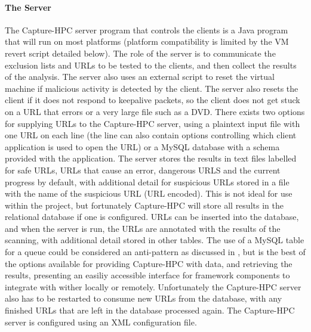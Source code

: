 \paragraph{The Server}
The Capture-HPC server program that controls the clients is a Java program that
will run on most platforms (platform compatibility is limited by the VM revert
script detailed below). The role of the server is to communicate the exclusion
lists and URLs to be tested to the clients, and then collect the results of the
analysis. The server also uses an external script to reset the virtual machine
if malicious activity is detected by the client. The server also resets the
client if it does not respond to keepalive packets, so the client does not get
stuck on a URL that errors or a very large file such as a DVD. There exists two
options for supplying URLs to the
Capture-HPC server, using a plaintext input file with one URL on each line (the
line can also contain options controlling which client application is used to
open the URL) or a MySQL database with a schema provided with the application.
The server stores the results in text files labelled for safe URLs, URLs that
cause an error, dangerous URLS and the current
progress by default, with additional detail for suspicious URLs stored in a file
with the name of the suspicious URL (URL encoded). This is not ideal for use within
the project, but fortunately Capture-HPC will store all results in the
relational database if one is configured. URLs can be inserted into the
database, and when the server is run, the URLs are annotated with the results of
the scanning, with additional detail stored in other tables.
The use of a MySQL table for a queue
could be considered an anti-pattern as discussed in \cite{anti-queue}, but is the best of
the options available for providing Capture-HPC with data, and retrieving the
results, presenting an easiliy accessible interface for framework components to
integrate with wither locally or remotely. Unfortunately the Capture-HPC server
also has to be restarted to
consume new URLs from the database, with any finished URLs that are left in the
database processed again. The Capture-HPC server is configured using an XML
configuration file.

